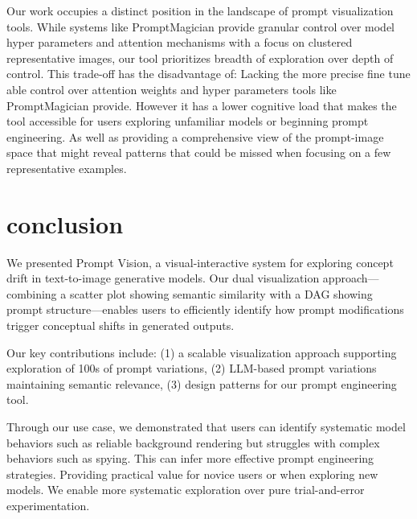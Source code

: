 \documentclass[
  a4paper,  %
  twoside,  %
  bibliography=totoc,
  headsepline,
  cleardoublepage=empty,
  parskip=half,
  draft=false
]{scrbook}
\begin{document}
Our work occupies a distinct position in the landscape of prompt visualization tools. While systems like PromptMagician \cite{PromptMagician} provide granular control over model hyper parameters and attention mechanisms with a focus on clustered representative images, our tool prioritizes breadth of exploration over depth of control. 
This trade-off has the disadvantage of: Lacking the more precise fine tune able control over attention weights and hyper parameters tools like PromptMagician provide. However it has a lower cognitive load that makes the tool accessible for users exploring unfamiliar models or beginning prompt engineering. As well as providing a comprehensive view of the prompt-image space that might reveal patterns that could be missed when focusing on a few representative examples.




















\chapter{conclusion}




We presented Prompt Vision, a visual-interactive system for exploring concept drift in text-to-image generative models. Our dual visualization approach—combining a scatter plot showing semantic similarity with a DAG showing prompt structure—enables users to efficiently identify how prompt modifications trigger conceptual shifts in generated outputs.

Our key contributions include: (1) a scalable visualization approach supporting exploration of 100s of prompt variations, (2) LLM-based prompt variations maintaining semantic relevance, (3) design patterns for our prompt engineering tool.

Through our use case, we demonstrated that users can identify systematic model behaviors such as reliable background rendering but struggles with complex behaviors such as spying. This can infer more effective prompt engineering strategies. Providing practical value for novice users or when exploring new models. We enable more systematic exploration over pure trial-and-error experimentation.
\end{document}
